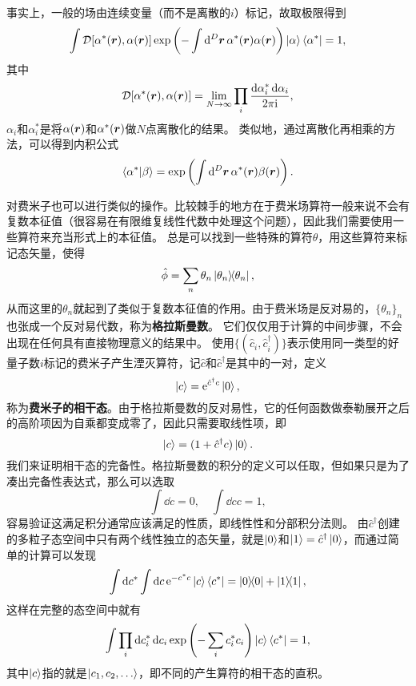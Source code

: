 \documentclass[hyperref, UTF8, a4paper]{ctexart}
\newcommand*{\ii}{\mathrm{i}}
\newcommand*{\ee}{\mathrm{e}}
\newcommand*{\fd}[1]{\mathcal{D}{#1}}
\begin{document}
事实上，一般的场由连续变量（而不是离散的$i$）标记，故取极限得到
\begin{equation}
    \int \fd{[\alpha^*(\vb*{r}), \alpha(\vb*{r})]} \exp \left( - \int \dd[D]{\vb*{r}} \alpha^*(\vb*{r}) \alpha(\vb*{r}) \right) \ket{\alpha} \bra{\alpha^*} = 1,
    \label{eq:completeness-of-boson}
\end{equation}
其中
\begin{equation}
    \fd{[\alpha^*(\vb*{r}), \alpha(\vb*{r})]} = \lim_{N\to \infty} \prod_i \frac{\dd{\alpha_i^*} \dd{\alpha_i}}{2\pi \ii},
\end{equation}
$\alpha_i$和$\alpha^*_i$是将$\alpha(\vb*{r})$和$\alpha^*(\vb*{r})$做$N$点离散化的结果。
类似地，通过离散化再相乘的方法，可以得到内积公式
\begin{equation}
    \braket{\alpha^*}{\beta} = \exp \left( \int \dd[D]{\vb*{r}} \alpha^*(\vb*{r}) \beta(\vb*{r}) \right).
\end{equation}

对费米子也可以进行类似的操作。比较棘手的地方在于费米场算符一般来说不会有复数本征值（很容易在有限维复线性代数中处理这个问题），因此我们需要使用一些算符来充当形式上的本征值。
总是可以找到一些特殊的算符$\theta$，用这些算符来标记态矢量，使得
\[
    \hat{\phi} = \sum_n \theta_n \dyad{\theta_n},
\]
从而这里的$\theta_n$就起到了类似于复数本征值的作用。由于费米场是反对易的，$\{\theta_n\}_n$也张成一个反对易代数，称为\textbf{格拉斯曼数}。
它们仅仅用于计算的中间步骤，不会出现在任何具有直接物理意义的结果中。
使用$\{(\hat{c}_i, \hat{c}_i^\dagger)\}$表示使用同一类型的好量子数$i$标记的费米子产生湮灭算符，记$\hat{c}$和$\hat{c}^\dagger$是其中的一对，定义
\begin{equation}
    \ket{c} = \ee^{\hat{c}^\dagger c} \ket{0},
\end{equation}
称为\textbf{费米子的相干态}。由于格拉斯曼数的反对易性，它的任何函数做泰勒展开之后的高阶项因为自乘都变成零了，因此只需要取线性项，即
\[
    \ket{c} = (1 + \hat{c}^\dagger c) \ket{0}.
\]
我们来证明相干态的完备性。格拉斯曼数的积分的定义可以任取，但如果只是为了凑出完备性表达式，那么可以选取
\begin{equation}
    \int \dd{c} = 0, \quad \int \dd{c} c = 1,
\end{equation}
容易验证这满足积分通常应该满足的性质，即线性性和分部积分法则。
由$\hat{c}^\dagger$创建的多粒子态空间中只有两个线性独立的态矢量，就是$\ket{0}$和$\ket{1} = \hat{c}^\dagger \ket{0}$，而通过简单的计算可以发现
\[
    \int \dd{c^*} \int \dd{c} \ee^{-c^* c} \ket{c} \bra{c^*} = \dyad{0} + \dyad{1},
\]
这样在完整的态空间中就有
\[
    \int \prod_i \dd{c^*_i} \dd{c_i} \exp \left( - \sum_i c^*_i c_i \right) \ket{c} \bra{c^*} = 1,
\]
其中$\ket{c}$指的就是$\ket{c_1, c_2, \ldots}$，即不同的产生算符的相干态的直积。
\end{document}
